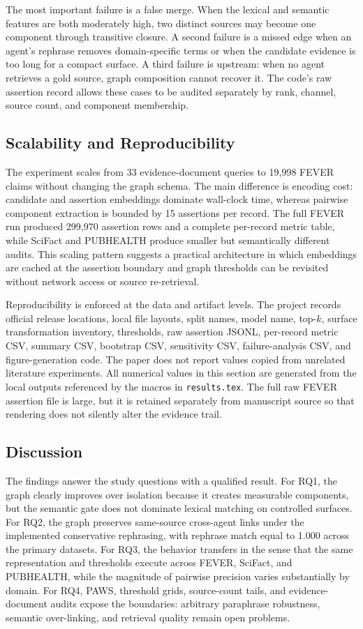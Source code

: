 \documentclass{ieeeaccess}
\begin{document}
The most important failure is a false merge. When the lexical and semantic features are both moderately high, two distinct sources may become one component through transitive closure. A second failure is a missed edge when an agent's rephrase removes domain-specific terms or when the candidate evidence is too long for a compact surface. A third failure is upstream: when no agent retrieves a gold source, graph composition cannot recover it. The code's raw assertion record allows these cases to be audited separately by rank, channel, source count, and component membership.

\subsection{Scalability and Reproducibility}
The experiment scales from 33 evidence-document queries to 19,998 FEVER claims without changing the graph schema. The main difference is encoding cost: candidate and assertion embeddings dominate wall-clock time, whereas pairwise component extraction is bounded by 15 assertions per record. The full FEVER run produced 299,970 assertion rows and a complete per-record metric table, while SciFact and PUBHEALTH produce smaller but semantically different audits. This scaling pattern suggests a practical architecture in which embeddings are cached at the assertion boundary and graph thresholds can be revisited without network access or source re-retrieval.

Reproducibility is enforced at the data and artifact levels. The project records official release locations, local file layouts, split names, model name, top-$k$, surface transformation inventory, thresholds, raw assertion JSONL, per-record metric CSV, summary CSV, bootstrap CSV, sensitivity CSV, failure-analysis CSV, and figure-generation code. The paper does not report values copied from unrelated literature experiments. All numerical values in this section are generated from the local outputs referenced by the macros in \texttt{results.tex}. The full raw FEVER assertion file is large, but it is retained separately from manuscript source so that rendering does not silently alter the evidence trail.

\subsection{Discussion}
The findings answer the study questions with a qualified result. For RQ1, the graph clearly improves over isolation because it creates measurable components, but the semantic gate does not dominate lexical matching on controlled surfaces. For RQ2, the graph preserves same-source cross-agent links under the implemented conservative rephrasing, with rephrase match equal to 1.000 across the primary datasets. For RQ3, the behavior transfers in the sense that the same representation and thresholds execute across FEVER, SciFact, and PUBHEALTH, while the magnitude of pairwise precision varies substantially by domain. For RQ4, PAWS, threshold grids, source-count tails, and evidence-document audits expose the boundaries: arbitrary paraphrase robustness, semantic over-linking, and retrieval quality remain open problems.
\end{document}
